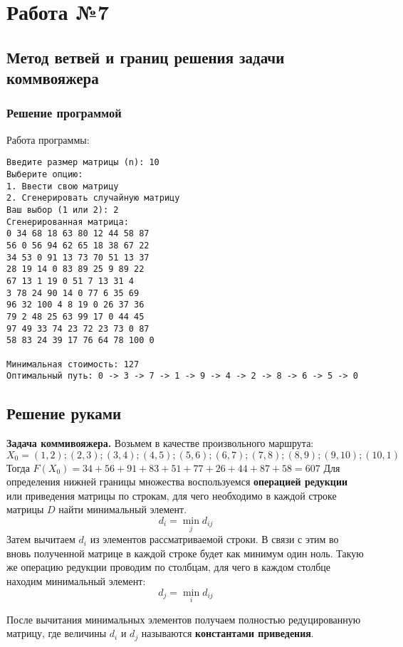 \documentclass[17pt]{extarticle}
\begin{document}
\section*{Работа №7}
\subsection*{Метод ветвей и границ решения задачи коммвояжера}

\subsubsection{Решение программой}

Работа программы:
\begin{verbatim}
Введите размер матрицы (n): 10
Выберите опцию:
1. Ввести свою матрицу
2. Сгенерировать случайную матрицу
Ваш выбор (1 или 2): 2
Сгенерированная матрица:
0 34 68 18 63 80 12 44 58 87
56 0 56 94 62 65 18 38 67 22
34 53 0 91 13 73 70 51 13 37
28 19 14 0 83 89 25 9 89 22
67 13 1 19 0 51 7 13 31 4
3 78 24 90 14 0 77 6 35 69
96 32 100 4 8 19 0 26 37 36
79 2 48 25 63 99 17 0 44 45
97 49 33 74 23 72 23 73 0 87
58 83 24 39 17 76 64 78 100 0

Минимальная стоимость: 127
Оптимальный путь: 0 -> 3 -> 7 -> 1 -> 9 -> 4 -> 2 -> 8 -> 6 -> 5 -> 0
\end{verbatim}

\subsection*{Решение руками}
\textbf{Задача коммивояжера.}
Возьмем в качестве произвольного маршрута:
\[ X_0 = (1,2);(2,3);(3,4);(4,5);(5,6);(6,7);(7,8);(8,9);(9,10);(10,1) \]
Тогда \( F(X_0) = 34 + 56 + 91 + 83 + 51 + 77 + 26 + 44 + 87 + 58 = 607 \)
Для определения нижней границы множества воспользуемся \textbf{операцией редукции} или приведения матрицы по строкам, для чего необходимо в каждой строке матрицы \( D \) найти минимальный элемент.
\[ d_i = \min_j d_{ij} \]
Затем вычитаем \( d_i \) из элементов рассматриваемой строки. В связи с этим во вновь полученной матрице в каждой строке будет как минимум один ноль.
Такую же операцию редукции проводим по столбцам, для чего в каждом столбце находим минимальный элемент:
\[ d_j = \min_i d_{ij} \]

После вычитания минимальных элементов получаем полностью редуцированную матрицу, где величины \( d_i \) и \( d_j \) называются \textbf{константами приведения}.
\end{document}
